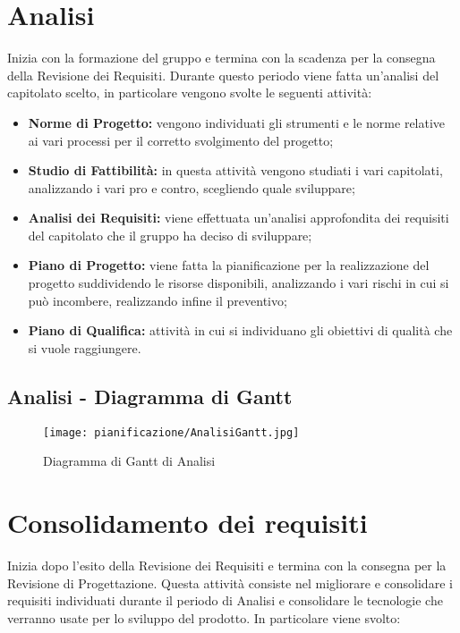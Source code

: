 \documentclass[../PianodiProgetto.tex]{subfiles}
\begin{document}
	\section{Analisi}
	Inizia con la formazione del gruppo e termina con la scadenza per la consegna della Revisione dei Requisiti.
	Durante questo periodo viene fatta un'analisi del capitolato scelto, in particolare vengono svolte le seguenti attività:
	\begin{itemize}
		\item \textbf{Norme di Progetto:} vengono individuati gli strumenti e le norme relative ai vari processi per il corretto svolgimento del progetto;
		\item \textbf{Studio di Fattibilità:} in questa attività vengono studiati i vari capitolati, analizzando i vari pro e contro, scegliendo quale sviluppare;
		\item \textbf{Analisi dei Requisiti:} viene effettuata un'analisi approfondita dei requisiti del capitolato che il gruppo ha deciso di sviluppare;
		\item \textbf{Piano di Progetto:} viene fatta la pianificazione per la realizzazione del progetto suddividendo le risorse disponibili, analizzando i vari rischi in cui si può incombere, realizzando infine il preventivo; 
		\item \textbf{Piano di Qualifica:} attività in cui si individuano gli obiettivi di qualità che si vuole raggiungere.	
	\end{itemize}
	
	\subsection{Analisi - Diagramma di Gantt}
	\begin{figure}[H]
		\texttt{[image: pianificazione/AnalisiGantt.jpg]}	
		\caption{Diagramma di Gantt di Analisi}\label{fig:1}	
	\end{figure}
	\newpage
	\section{Consolidamento dei requisiti} Inizia dopo l'esito della Revisione dei Requisiti e termina con la consegna per la Revisione di Progettazione. Questa attività consiste nel migliorare e consolidare i requisiti individuati durante il periodo di Analisi e consolidare le tecnologie che verranno usate per lo sviluppo del prodotto. In particolare viene svolto:
\end{document}
